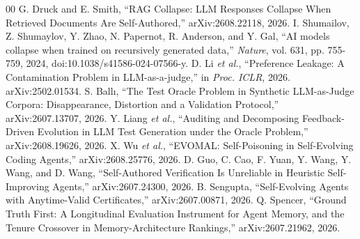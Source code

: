 \documentclass[conference]{IEEEtran}
\begin{document}
\begin{thebibliography}{00}
 G. Druck and E. Smith, ``RAG Collapse: LLM Responses Collapse When Retrieved
Documents Are Self-Authored,'' arXiv:2608.22118, 2026.
 I. Shumailov, Z. Shumaylov, Y. Zhao, N. Papernot, R. Anderson, and Y. Gal,
``AI models collapse when trained on recursively generated data,'' \emph{Nature}, vol. 631, pp.
755-759, 2024, doi:10.1038/s41586-024-07566-y.
 D. Li \emph{et al.}, ``Preference Leakage: A Contamination Problem in
LLM-as-a-judge,'' in \emph{Proc. ICLR}, 2026. arXiv:2502.01534.
 S. Ball\i, ``The Test Oracle Problem in Synthetic LLM-as-Judge Corpora:
Disappearance, Distortion and a Validation Protocol,'' arXiv:2607.13707, 2026.
 Y. Liang \emph{et al.}, ``Auditing and Decomposing Feedback-Driven Evolution
in LLM Test Generation under the Oracle Problem,'' arXiv:2608.19626, 2026.
 X. Wu \emph{et al.}, ``EVOMAL: Self-Poisoning in Self-Evolving Coding Agents,''
arXiv:2608.25776, 2026.
 D. Guo, C. Cao, F. Yuan, Y. Wang, Y. Wang, and D. Wang, ``Self-Authored
Verification Is Unreliable in Heuristic Self-Improving Agents,'' arXiv:2607.24300, 2026.
 B. Sengupta, ``Self-Evolving Agents with Anytime-Valid Certificates,''
arXiv:2607.00871, 2026.
 Q. Spencer, ``Ground Truth First: A Longitudinal Evaluation Instrument
for Agent Memory, and the Tenure Crossover in Memory-Architecture Rankings,'' arXiv:2607.21962, 2026.
\end{thebibliography}
\end{document}
